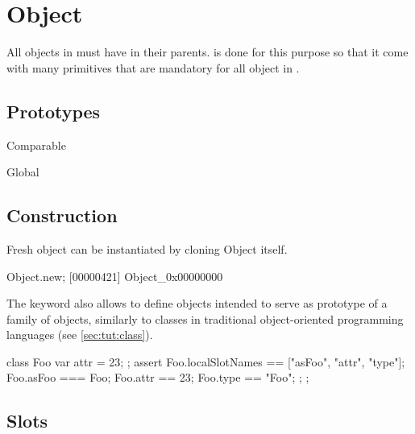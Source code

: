 
\section{Object}

All objects in \us must have  in their
parents.  is done for this purpose so that it come
with many primitives that are mandatory for all object in \us.

\subsection{Prototypes}

\begin{refObjects}
\item[Comparable]
\item[Global]
\end{refObjects}

\subsection{Construction}

Fresh object can be instantiated by cloning Object itself.

\begin{urbiscript}[firstnumber=1]
Object.new;
[00000421] Object_0x00000000
\end{urbiscript}

The keyword  also allows to define objects intended to serve
as prototype of a family of objects, similarly to classes in traditional
object-oriented programming languages (see \autoref{sec:tut:class}).

\begin{urbiscript}
{
  class Foo
  {
    var attr = 23;
  };
  assert
  {
    Foo.localSlotNames == ["asFoo", "attr", "type"];
    Foo.asFoo === Foo;
    Foo.attr == 23;
    Foo.type == "Foo";
  };
};
\end{urbiscript}


\subsection{Slots}

